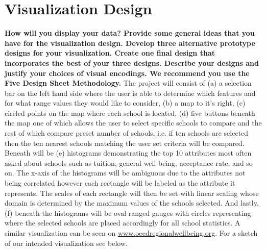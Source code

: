 \documentclass[11pt, a4paper]{article}
\begin{document}
  \section{Visualization Design}
  \textbf{ How will you display your data? Provide some general ideas that you have for the visualization design. Develop three alternative prototype designs for your visualization. Create one final design that incorporates the best of your three designs. Describe your designs and justify your choices of visual encodings. We recommend you use the Five Design Sheet Methodology.}
  The project will consist of (a) a selection bar on the left hand side where the user is able to determine which features and for what range values they would like to consider, (b) a map to it's right, (c) circled points on the map where each school is located, (d) five buttons beneath the map one of which allows the user to select specific schools to compare and the rest of which compare preset number of schools, i.e. if ten schools are selected then the ten nearest schools matching the user set criteria will be compared. Beneath will be (e) histograms demonstrating the top 10 attributes most often asked about schools such as tuition, general well being, acceptance rate, and so on. The x-axis of the histograms will be ambiguous due to the attributes not being correlated however each rectangle will be labeled as the attribute it represents. The scales of each rectangle will then be set with linear scaling whose domain is determined by the maximum values of the schools selected. And lastly, (f) beneath the histograms will be oval ranged gauges with circles representing where the selected schools are placed accordingly for all school statistics. A similar visualization can be seen on \href{https://www.oecdregionalwellbeing.org}{www.oecdregionalwellbeing.org}. For a sketch of our intended visualization see below.  
\begin{figure}[h]
\label{visualization sketch}
\end{figure}
\end{document}
